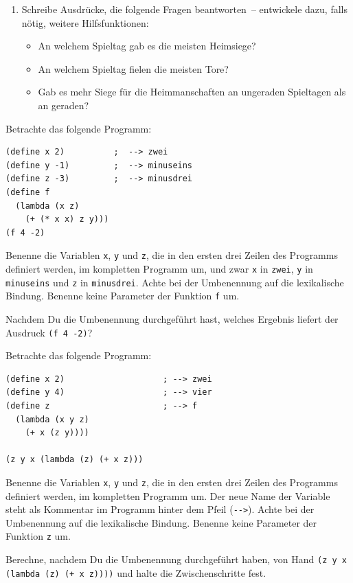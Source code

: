 \begin{aufgabe}
\begin{enumerate}
  \item Schreibe Ausdrücke, die folgende Fragen beantworten~--
  entwickele dazu, falls nötig, weitere Hilfsfunktionen:
  \begin{itemize}
    \item An welchem Spieltag gab es die meisten Heimsiege?
    \item An welchem Spieltag fielen die meisten Tore?
    \item Gab es mehr Siege für die Heimmanschaften an ungeraden Spieltagen als an
      geraden?
    \end{itemize}
\end{enumerate} 

\end{aufgabe}

\begin{aufgabe}

  Betrachte das folgende Programm:

\begin{lstlisting}
(define x 2)          ;  --> zwei
(define y -1)         ;  --> minuseins
(define z -3)         ;  --> minusdrei
(define f 
  (lambda (x z)
    (+ (* x x) z y)))
(f 4 -2)
\end{lstlisting}
  Benenne die Variablen \lstinline{x}, \lstinline{y} und \lstinline{z}, die in
  den ersten drei Zeilen des Programms definiert werden, im kompletten
  Programm um, und zwar \lstinline{x} in \lstinline{zwei}, \lstinline{y} in
  \lstinline{minuseins} und \lstinline{z} in \lstinline{minusdrei}. Achte bei
  der Umbenennung auf die lexikalische Bindung.  Benenne keine
  Parameter der Funktion \lstinline{f} um.

  Nachdem Du die Umbenennung durchgeführt hast, welches Ergebnis liefert
  der Ausdruck \lstinline{(f 4 -2)}?
\end{aufgabe}

\begin{aufgabe}

  Betrachte das folgende Programm:

\begin{lstlisting}
(define x 2)                    ; --> zwei
(define y 4)                    ; --> vier
(define z                       ; --> f
  (lambda (x y z)
    (+ x (z y))))

(z y x (lambda (z) (+ x z)))
\end{lstlisting}
%
  Benenne die Variablen \lstinline{x}, \lstinline{y} und \lstinline{z}, die in
  den ersten drei Zeilen des Programms definiert werden, im kompletten
  Programm um. Der neue Name der Variable steht als Kommentar im
  Programm hinter dem Pfeil (\lstinline{-->}).  Achte bei der
  Umbenennung auf die lexikalische Bindung.  Benenne keine
  Parameter der Funktion \lstinline{z} um.

  Berechne, nachdem Du die Umbenennung durchgeführt haben, von
  Hand \lstinline{(z y x}
  \lstinline{(lambda (z) (+ x z))))} und halte die Zwischenschritte
  fest.

\end{aufgabe}

